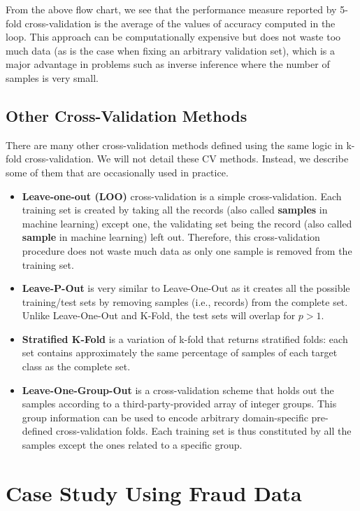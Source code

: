\documentclass[
]{book}
\begin{document}
From the above flow chart, we see that the performance measure reported by 5-fold cross-validation is the average of the values of accuracy computed in the loop. This approach can be computationally expensive but does not waste too much data (as is the case when fixing an arbitrary validation set), which is a major advantage in problems such as inverse inference where the number of samples is very small.

\hypertarget{other-cross-validation-methods}{%
\subsection{Other Cross-Validation Methods}\label{other-cross-validation-methods}}

There are many other cross-validation methods defined using the same logic in k-fold cross-validation. We will not detail these CV methods. Instead, we describe some of them that are occasionally used in practice.

\begin{itemize}
\item
  \textbf{Leave-one-out (LOO)} cross-validation is a simple cross-validation. Each training set is created by taking all the records (also called \textbf{samples} in machine learning) except one, the validating set being the record (also called \textbf{sample} in machine learning) left out. Therefore, this cross-validation procedure does not waste much data as only one sample is removed from the training set.
\item
  \textbf{Leave-P-Out} is very similar to Leave-One-Out as it creates all the possible training/test sets by removing samples (i.e., records) from the complete set. Unlike Leave-One-Out and K-Fold, the test sets will overlap for \(p > 1\).
\item
  \textbf{Stratified K-Fold} is a variation of k-fold that returns stratified folds: each set contains approximately the same percentage of samples of each target class as the complete set.
\item
  \textbf{Leave-One-Group-Out} is a cross-validation scheme that holds out the samples according to a third-party-provided array of integer groups. This group information can be used to encode arbitrary domain-specific pre-defined cross-validation folds. Each training set is thus constituted by all the samples except the ones related to a specific group.
\end{itemize}

\hypertarget{case-study-using-fraud-data}{%
\section{Case Study Using Fraud Data}\label{case-study-using-fraud-data}}
\end{document}

